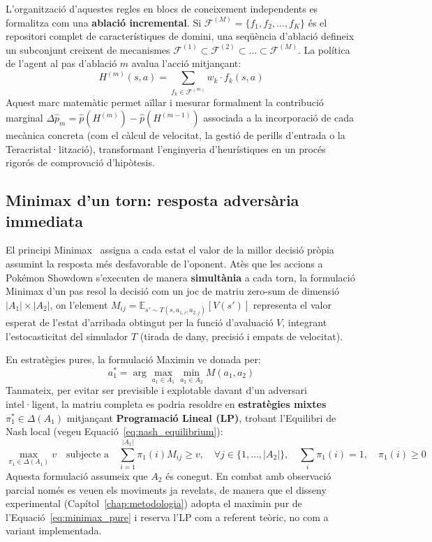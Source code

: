 L'organització d'aquestes regles en blocs de coneixement independents es formalitza com una \textbf{ablació incremental}. Si $\mathcal{F}^{(M)} = \{f_1, f_2, \dots, f_K\}$ és el repositori complet de característiques de domini, una seqüència d'ablació defineix un subconjunt creixent de mecanismes $\mathcal{F}^{(1)} \subset \mathcal{F}^{(2)} \subset \dots \subset \mathcal{F}^{(M)}$. La política de l'agent al pas d'ablació $m$ avalua l'acció mitjançant:
\begin{equation}
    H^{(m)}(s, a) = \sum_{f_k \in \mathcal{F}^{(m)}} w_k \cdot f_k(s, a)
    \label{eq:heuristic_ablation}
\end{equation}
Aquest marc matemàtic permet aïllar i mesurar formalment la contribució marginal $\Delta \hat{p}_m = \hat{p}(H^{(m)}) - \hat{p}(H^{(m-1)})$ associada a la incorporació de cada mecànica concreta (com el càlcul de velocitat, la gestió de perills d'entrada o la Teracristal·lització), transformant l'enginyeria d'heurístiques en un procés rigorós de comprovació d'hipòtesis.

\subsection{Minimax d'un torn: resposta adversària immediata}
\label{subsec:teoria_minimax}

El principi Minimax~\cite{von_neumann,minimax_knuth} assigna a cada estat el valor de la millor decisió pròpia assumint la resposta més desfavorable de l'oponent. Atès que les accions a Pokémon Showdown s'executen de manera \textbf{simultània} a cada torn, la formulació Minimax d'un pas resol la decisió com un joc de matriu zero-sum de dimensió $|A_1| \times |A_2|$, on l'element $M_{ij} = \mathbb{E}_{s' \sim T(s, a_{1,i}, a_{2,j})} [V(s')]$ representa el valor esperat de l'estat d'arribada obtingut per la funció d'avaluació $V$, integrant l'estocasticitat del simulador $T$ (tirada de dany, precisió i empats de velocitat).

En estratègies pures, la formulació Maximin ve donada per:
\begin{equation}
    a_1^* = \arg\max_{a_1 \in A_1} \min_{a_2 \in A_2} M(a_1, a_2)
    \label{eq:minimax_pure}
\end{equation}
Tanmateix, per evitar ser previsible i explotable davant d'un adversari intel·ligent, la matriu completa es podria resoldre en \textbf{estratègies mixtes} $\pi_1^* \in \Delta(A_1)$ mitjançant \textbf{Programació Lineal (LP)}, trobant l'Equilibri de Nash local (vegeu Equació~\ref{eq:nash_equilibrium}):
\begin{equation}
    \max_{\pi_1 \in \Delta(A_1)} v \quad \text{subjecte a} \quad \sum_{i=1}^{|A_1|} \pi_1(i) M_{ij} \ge v, \quad \forall j \in \{1, \dots, |A_2|\}, \quad \sum_{i} \pi_1(i) = 1, \quad \pi_1(i) \ge 0
    \label{eq:minimax_lp}
\end{equation}
Aquesta formulació assumeix que $A_2$ és conegut. En combat amb observació parcial només es veuen els moviments ja revelats, de manera que el disseny experimental (Capítol~\ref{chap:metodologia}) adopta el maximin pur de l'Equació~\ref{eq:minimax_pure} i reserva l'LP com a referent teòric, no com a variant implementada.

